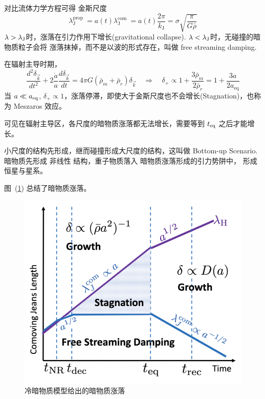 \documentclass[12pt]{ctexart}
\newcommand{\reffig}[1]{图~(\ref{#1})}
\begin{document}
对比流体力学方程可得 金斯尺度 
\begin{equation}
    \lambda_{\mathrm{J}}^{\text {prop }}=a(t) \lambda_{\mathrm{J}}^{\text {com }}=a(t) \frac{2 \pi}{k_{\mathrm{J}}}=\sigma \sqrt{\frac{\pi}{G \bar{\rho}}}
\end{equation}
$\lambda > \lambda_{\rm{J}}$时，涨落在引力作用下增长(gravitational collapse).
$\lambda < \lambda_{\rm{J}}$时，无碰撞的暗物质粒子会将 涨落抹掉，而不是以波的形式存在，叫做 free streaming damping.


在辐射主导时期，
\begin{equation}
    \frac{d^{2} \delta_{\vec{k}} }{d t^{2}}+2 \frac{\dot{a}}{a} \frac{d \delta_{\vec{k}}}{d t}=4 \pi G\left(\bar{\rho}_{m}+\bar{\rho}_{r}\right) \delta_{\vec{k}} \quad \Rightarrow \quad \delta_{+} \propto 1+\frac{3 \bar{\rho}_{m}}{2 \bar{\rho}_{r}}=1+\frac{3 a}{2 a_{\mathrm{eq}}} 
\end{equation}
当 $a\ll a_{\rm{eq}}$, $\delta_{+}\propto 1$，涨落停滞，即使大于金斯尺度也不会增长(Stagnation)，也称为 Meszaros 效应。

可见在辐射主导区，各尺度的暗物质涨落都无法增长，需要等到 $t_{\rm{eq}}$ 之后才能增长。

小尺度的结构先形成，继而碰撞形成大尺度的结构，这叫做 Bottom-up Scenario.
暗物质先形成 非线性 结构，重子物质落入 暗物质涨落形成的引力势阱中，
形成恒星与星系。

\reffig{fig:CDM_pert} 总结了暗物质涨落。
\begin{figure}[!hbtp]
	\centering 
	\includegraphics[width=1.0\linewidth]{CDM_pertu.png}
	\caption{冷暗物质模型给出的暗物质涨落}
    \label{fig:CDM_pert}
\end{figure}
\end{document}
